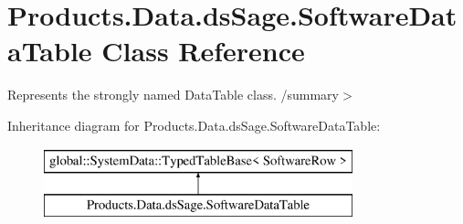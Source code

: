 \hypertarget{class_products_1_1_data_1_1ds_sage_1_1_software_data_table}{}\section{Products.\+Data.\+ds\+Sage.\+Software\+Data\+Table Class Reference}
\label{class_products_1_1_data_1_1ds_sage_1_1_software_data_table}


Represents the strongly named Data\+Table class. /summary$>$  


Inheritance diagram for Products.\+Data.\+ds\+Sage.\+Software\+Data\+Table\+:\begin{figure}[H]
\begin{center}
\leavevmode
\includegraphics[height=2.000000cm]{class_products_1_1_data_1_1ds_sage_1_1_software_data_table}
\end{center}
\end{figure}
